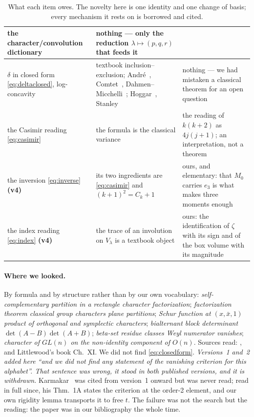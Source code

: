 \documentclass[11pt,a4paper]{article}
\begin{document}
\begin{table}[!htbp]
\begin{tabular}{p{4.0cm}p{5.2cm}p{5.0cm}}
the character/convolution dictionary~\cite{BradleyGupta} &
nothing --- only the reduction $\lambda\mapsto(p,q,r)$ that feeds it\\
\midrule
\rowcolor{softgrey}
$\delta$ in closed form \eqref{eq:deltaclosed}, log-concavity &
textbook inclusion--exclusion; André~\cite{Andre}, Comtet~\cite{Comtet},
Dahmen--Micchelli~\cite{DahmenMicchelli}; Hoggar~\cite{Hoggar}, Stanley~\cite{Stanley} &
nothing --- we had mistaken a classical theorem for an open question\\
\midrule
the Casimir reading \eqref{eq:casimir} & the formula is the classical variance~\cite{Neuschel} &
the reading of $k(k+2)$ as $4j(j+1)$; an interpretation, not a theorem\\
\midrule
\rowcolor{softgrey}
the inversion \eqref{eq:inverse} \textbf{(v4)} & its two ingredients are \eqref{eq:casimir} and
$(k+1)^2=C_k+1$ & ours, and elementary: that $M_0$ carries $e_3$ is what makes three moments
enough\\
\midrule
the index reading \eqref{eq:index} \textbf{(v4)} & the trace of an involution on $V_\lambda$ is a
textbook object & ours: the identification of $\zeta$ with its sign and of the box volume with its
magnitude\\
\bottomrule
\end{tabular}
\caption{What each item owes. The novelty here is one identity and one change of basis; every
mechanism it rests on is borrowed and cited.}
\label{tab:ledger}
\end{table}

\paragraph{Where we looked.} By formula and by structure rather than by our own vocabulary:
\emph{self-complementary partition in a rectangle character factorization}; \emph{factorization
theorem classical group characters plane partitions}; \emph{Schur function at $(x,\bar x,1)$
product of orthogonal and symplectic characters}; \emph{bialternant block determinant
$\det(A-B)\det(A+B)$}; \emph{beta-set residue classes Weyl numerator vanishes}; \emph{character
of $GL(n)$ on the non-identity component of $O(n)$}. Sources read: \cite{CK,AB,AK,Kumari,%
Albion,Karmakar}, and Littlewood's book Ch.~XI. We did not find \eqref{eq:closedform}.
\emph{Versions~1 and~2 added here ``and we did not find any statement of the vanishing criterion
for this alphabet''. That sentence was wrong, it stood in both published versions, and it is
withdrawn.} Karmakar~\cite{Karmakar} was cited from version~1 onward but was never read; read in full
since, his Thm.~1A states the criterion at the order-2 element, and our own rigidity lemma transports
it to free $t$. The failure was not the search but the
reading: the paper was in our bibliography the whole time.
\end{document}
